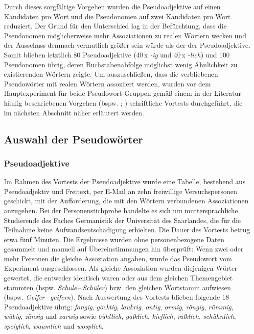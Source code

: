 Durch dieses sorgfältige Vorgehen wurden die Pseudoadjektive auf einen Kandidaten pro Wort und die Pseudonomen auf zwei Kandidaten pro Wort reduziert. Der Grund für den Unterschied lag in der Befürchtung, dass die Pseudonomen möglicherweise mehr Assoziationen zu realen Wörtern wecken und der Ausschuss demnach vermutlich größer sein würde als der der Pseudoadjektive. Somit blieben letztlich 80 Pseudoadjektive (40\,x \textit{-ig} und {40\,x \textit{-lich}}) und 100 Pseudonomen übrig, deren Buchstabenabfolge möglichst wenig Ähnlichkeit zu existierenden Wörtern zeigte. Um auszuschließen, dass die verbliebenen Pseudowörter mit realen Wörtern assoziiert werden, wurden vor dem Hauptexperiment für beide Pseudowort-Gruppen gemäß einem in der Literatur häufig beschriebenen Vorgehen (bspw. \citealt[668]{Kemp.2009}; \citealt[458]{Riedl.2014}) schriftliche Vortests durchgeführt, die im nächsten Abschnitt näher erläutert werden.


\subsection{Auswahl der Pseudowörter}\label{abs:Auswahl}
\subsubsection{Pseudoadjektive}\label{abs:Auswahl-Adj}
Im Rahmen des Vortests der Pseudoadjektive wurde eine Tabelle, bestehend aus Pseudoadjektiv und Freitext, per E-Mail an zehn freiwillige Versuchspersonen geschickt, mit der Aufforderung, die mit den Wörtern verbundenen Assoziationen anzugeben. Bei der Personenstichprobe handelte es sich um muttersprachliche Studierende des Faches Germanistik der Universität des Saarlandes, die für die Teilnahme keine Aufwandsentschädigung erhielten. Die Dauer des Vortests betrug etwa fünf Minuten. Die Ergebnisse wurden ohne personenbezogene Daten gesammelt und manuell auf Übereinstimmungen hin überprüft: Wenn zwei oder mehr Personen die gleiche Assoziation angaben, wurde das Pseudowort vom Experiment ausgeschlossen. Als gleiche Assoziation wurden diejenigen Wörter gewertet, die entweder identisch waren oder aus dem gleichen Themengebiet stammten (bspw. \textit{Schule}\,--\,\textit{Schüler}) bzw. den gleichen Wortstamm aufwiesen (bspw. \textit{Geifer}\,--\,\textit{geifern}). Nach Auswertung des Vortests blieben folgende 18 Pseudoadjektive übrig: \textit{fongig}, \textit{göcktig}, \textit{laukrig}, \textit{ontig}, \textit{ormig}, \textit{röngig}, \textit{rümmig}, \textit{wübig}, \textit{zänsig} und \textit{zarwig} sowie \textit{bühllich}, \textit{galklich}, \textit{kieflich}, \textit{ralklich}, \textit{schühnlich}, \textit{speiglich}, \textit{waumlich} {und \textit{wosplich}}.



